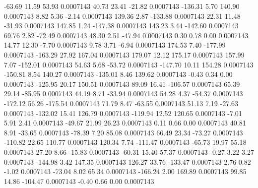       -63.69       11.59       53.93     0.0007143
       40.73       23.41      -21.82     0.0007143
     -136.31        5.70      140.90     0.0007143
        8.82        5.36       -2.14     0.0007143
      139.36        2.87     -133.88     0.0007143
       22.31       11.48      -31.93     0.0007143
      147.85        1.24     -147.38     0.0007143
      143.23        3.44     -142.60     0.0007143
       69.76        2.82      -72.49     0.0007143
       48.30        2.51      -47.94     0.0007143
        0.30        0.78        0.00     0.0007143
       14.77       12.30       -7.70     0.0007143
        9.78        3.71       -6.94     0.0007143
      174.53        7.40     -177.99     0.0007143
     -163.29       27.92      167.04     0.0007143
      179.07       12.12      175.17     0.0007143
      157.99        7.07     -152.01     0.0007143
       54.63        5.68      -53.72     0.0007143
     -147.70       10.11      154.28     0.0007143
     -150.81        8.54      140.27     0.0007143
     -135.01        8.46      139.62     0.0007143
       -0.43        0.34        0.00     0.0007143
     -125.95       20.17      150.51     0.0007143
       89.09       16.41     -106.57     0.0007143
       65.39       29.14      -85.95     0.0007143
       44.19        8.71      -33.94     0.0007143
       54.28        4.37      -54.37     0.0007143
     -172.12       56.26     -175.54     0.0007143
       71.79        8.47      -63.55     0.0007143
       51.13        7.19      -27.63     0.0007143
     -132.02       15.41      126.79     0.0007143
     -119.94       12.52      120.65     0.0007143
       -7.01        5.91        2.41     0.0007143
      -49.67       21.99       26.23     0.0007143
        0.11        0.66        0.00     0.0007143
       40.81        8.91      -33.65     0.0007143
      -78.39        7.20       85.08     0.0007143
       66.49       23.34      -73.27     0.0007143
     -110.82       22.65      110.77     0.0007143
      120.34        7.74     -111.47     0.0007143
      -65.73       19.97       55.18     0.0007143
       27.20        8.66      -15.83     0.0007143
      -60.31       15.40       57.37     0.0007143
       -0.27        3.22        3.27     0.0007143
     -144.98        3.42      147.35     0.0007143
      126.27       33.76     -133.47     0.0007143
        2.76        0.82       -1.02     0.0007143
      -73.04        8.02       65.34     0.0007143
     -166.24        2.00      169.89     0.0007143
       99.85       14.86     -104.47     0.0007143
       -0.40        0.66        0.00     0.0007143
